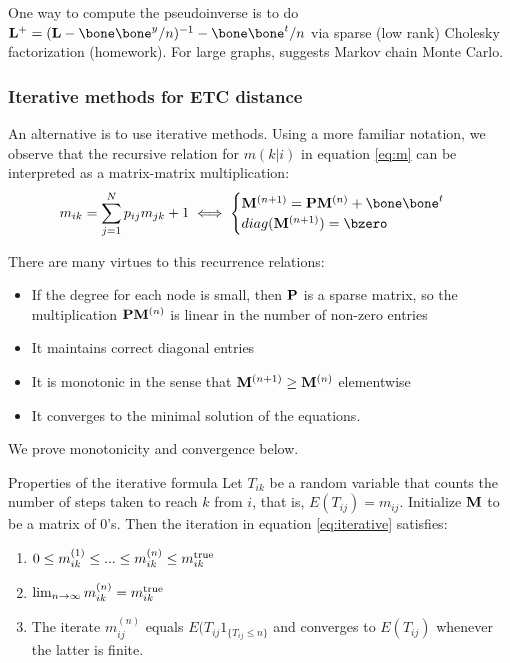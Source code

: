 \documentclass[./some_latex_template.tex]{subfiles}
\begin{document}
One way to compute the pseudoinverse is to do $\bL^+ = (\bL - \bone\bone^y/n)^{-1} - \bone\bone^t/n$ via sparse (low rank) Cholesky factorization \cite{fouss2007random} (homework). For large graphs, \citep{yen2005clustering} suggests Markov chain Monte Carlo. 

\subsubsection{Iterative methods for ETC distance}

An alternative is to use iterative methods. Using a more familiar notation, we observe that the recursive relation for $m(k|i)$ in equation \eqref{eq:m} can be interpreted as a matrix-matrix multiplication: 
\begin{align}\label{eq:iterative}
m_{ik} = \sum_{j=1}^Np_{ij}m_{jk} + 1 \iff \begin{cases}
	\bM^{(n+1)} = \bP\bM^{(n)} + \bone\bone^t\\
	diag(\bM^{(n+1)}) = \bzero
\end{cases}
\end{align}

\noindent There are many virtues to this recurrence relations: 
\begin{itemize}
	\item If the degree for each node is small, then $\mathbf{P}$ is a sparse matrix, so the multiplication $\mathbf{P}\mathbf{M}^{(n)}$ is linear in the number of non-zero entries
	\item It maintains correct diagonal entries
	\item It is monotonic in the sense that $\mathbf{M}^{(n + 1)} \geq \mathbf{M}^{(n)}$ elementwise
	\item It converges to the minimal solution of the equations. 
\end{itemize}

\noindent We prove monotonicity and convergence below.

\begin{theorembox}{Properties of the iterative formula}{}
Let $T_{ik}$ be a random variable that counts the number of steps taken to reach $k$ from $i$, that is, $E(T_{ij}) = m_{ij}$. Initialize $\mathbf{M}$ to be a matrix of $0$'s. Then the iteration in equation \eqref{eq:iterative} satisfies:
\begin{enumerate}
	\item $0 \le m_{ik}^{(1)} \le ... \le m_{ik}^{(n)} \le m_{ik}^{\rm true}$
	\item $\lim_{n \rightarrow \infty} m_{ik}^{(n)} = m_{ik}^{\rm true}$
	\item The iterate $m_{ij}^{(n)}$ equals $E(T_{ij}1_{\{T_{ij}\le n\}}$ and converges to $E(T_{ij})$ whenever the latter is finite. 
\end{enumerate}
\end{theorembox}
\end{document}
